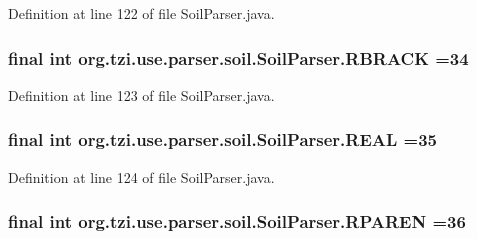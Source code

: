 Definition at line 122 of file Soil\-Parser.\-java.

\hypertarget{classorg_1_1tzi_1_1use_1_1parser_1_1soil_1_1_soil_parser_adc60a3590c3df5e9216c8c9f951cbc7e}{
\subsubsection[{R\-B\-R\-A\-C\-K}]{\setlength{\rightskip}{0pt plus 5cm}final int org.\-tzi.\-use.\-parser.\-soil.\-Soil\-Parser.\-R\-B\-R\-A\-C\-K =34\hspace{0.3cm}{\ttfamily [static]}}}\label{classorg_1_1tzi_1_1use_1_1parser_1_1soil_1_1_soil_parser_adc60a3590c3df5e9216c8c9f951cbc7e}


Definition at line 123 of file Soil\-Parser.\-java.

\hypertarget{classorg_1_1tzi_1_1use_1_1parser_1_1soil_1_1_soil_parser_a07971a8a3cf7b6a7792933658de8cd0e}{
\subsubsection[{R\-E\-A\-L}]{\setlength{\rightskip}{0pt plus 5cm}final int org.\-tzi.\-use.\-parser.\-soil.\-Soil\-Parser.\-R\-E\-A\-L =35\hspace{0.3cm}{\ttfamily [static]}}}\label{classorg_1_1tzi_1_1use_1_1parser_1_1soil_1_1_soil_parser_a07971a8a3cf7b6a7792933658de8cd0e}


Definition at line 124 of file Soil\-Parser.\-java.

\hypertarget{classorg_1_1tzi_1_1use_1_1parser_1_1soil_1_1_soil_parser_abf8ded357c938592ba8526b7d9372463}{
\subsubsection[{R\-P\-A\-R\-E\-N}]{\setlength{\rightskip}{0pt plus 5cm}final int org.\-tzi.\-use.\-parser.\-soil.\-Soil\-Parser.\-R\-P\-A\-R\-E\-N =36\hspace{0.3cm}{\ttfamily [static]}}}\label{classorg_1_1tzi_1_1use_1_1parser_1_1soil_1_1_soil_parser_abf8ded357c938592ba8526b7d9372463}


